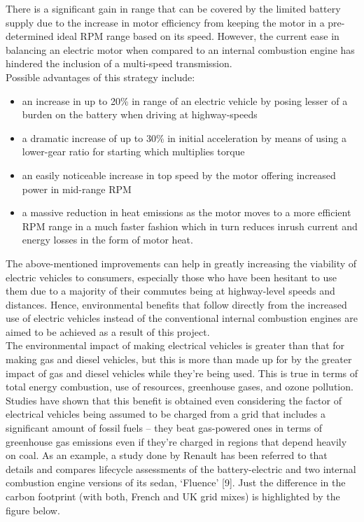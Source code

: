 \documentclass{article}
\begin{document}
\noindent There is a significant gain in range that can be covered by the limited battery supply due to the increase in motor efficiency from keeping the motor in a pre-determined ideal RPM range based on its speed. However, the current ease in balancing an electric motor when compared to an internal combustion engine has hindered the inclusion of a multi-speed transmission.\\

\noindent Possible advantages of this strategy include:

\begin{itemize}
  \item an increase in up to 20\% in range of an electric vehicle by posing lesser of a burden on the battery when driving at highway-speeds
  \item a dramatic increase of up to 30\% in initial acceleration by means of using a lower-gear ratio for starting which multiplies torque
  \item an easily noticeable increase in top speed by the motor offering increased power in mid-range RPM
  \item a massive reduction in heat emissions as the motor moves to a more efficient RPM range in a much faster fashion which in turn reduces inrush current and energy losses in the form of motor heat. 
\end{itemize}

\noindent The above-mentioned improvements can help in greatly increasing the viability of electric vehicles to consumers, especially those who have been hesitant to use them due to a majority of their commutes being at highway-level speeds and distances. Hence, environmental benefits that follow directly from the increased use of electric vehicles instead of the conventional internal combustion engines are aimed to be achieved as a result of this project.\\

\noindent The environmental impact of making electrical vehicles is greater than that for making gas and diesel vehicles, but this is more than made up for by the greater impact of gas and diesel vehicles while they’re being used. This is true in terms of total energy combustion, use of resources, greenhouse gases, and ozone pollution. Studies have shown that this benefit is obtained even considering the factor of electrical vehicles being assumed to be charged from a grid that includes a significant amount of fossil fuels – they beat gas-powered ones in terms of greenhouse gas emissions even if they’re charged in regions that depend heavily on coal. As an example, a study done by Renault has been referred to that details and compares lifecycle assessments of the battery-electric and two internal combustion engine versions of its sedan, ‘Fluence’ [9]. Just the difference in the carbon footprint (with both, French and UK grid mixes) is highlighted by the figure below.\\
\end{document}
